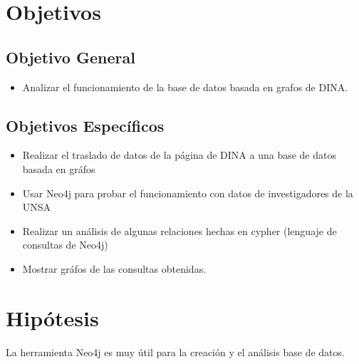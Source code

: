 
\section{Objetivos}
\subsection{Objetivo General}
\begin{itemize}
    \item Analizar el funcionamiento de la base de datos basada en grafos de DINA.
\end{itemize}

\subsection{Objetivos Específicos}
\begin{itemize}
\item  Realizar el traslado de datos de la página de DINA a una base de datos basada en gráfos
\item Usar Neo4j para probar el funcionamiento con datos de investigadores de la UNSA
\item Realizar un análisis de algunas relaciones hechas en cypher (lenguaje de consultas de Neo4j)
\item Mostrar gráfos de las consultas obtenidas.
\end{itemize}
\section{Hipótesis}
La herramienta Neo4j es muy útil para la creación y el análisis base de datos.
